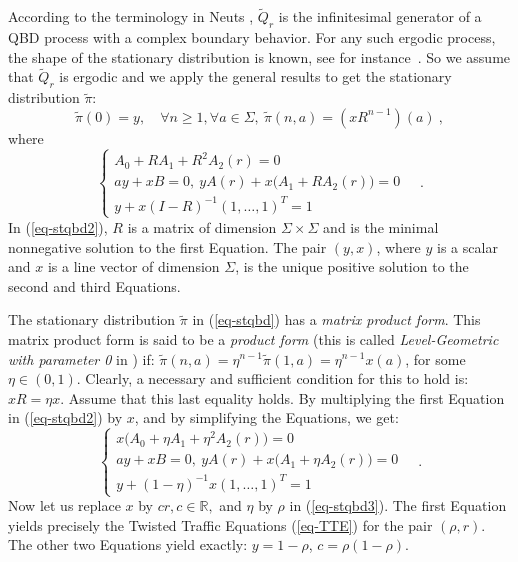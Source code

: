 \documentclass[11pt,a4paper]{article}
\theoremstyle{remark}
\def\Blackboardfont{\mathbb}
\def\R{{\Blackboardfont R}}
\def\eref#1{(\ref{#1})}
\begin{document}
\medskip

According to the terminology in Neuts \cite{neut}, $\widetilde{Q}_r$
is the infinitesimal generator of a QBD
process with a complex boundary behavior. For any such ergodic
process, the shape of the stationary
distribution is known, see for instance~\cite[Chapter
  1.5]{neut}. So we assume that $\widetilde{Q}_r$ is ergodic and we
apply the general results to get the stationary
distribution $\widetilde{\pi}$:
\begin{equation}\label{eq-stqbd}
\widetilde{\pi}(0) = y, \quad \forall n\geq 1,\forall a\in \Sigma, \ \widetilde{\pi}(n,a) =
(xR^{n-1})(a) \:,
\end{equation}
where
\begin{equation}\label{eq-stqbd2}
\begin{cases}
A_0 + RA_1 + R^2 A_2(r) = 0 & \\
ay + xB =0, \ yA(r) + x\bigl( A_1 + RA_2(r) \bigr) = 0 & \\
y + x (I -R)^{-1} (1,\dots ,1)^T =1 &
\end{cases}\:.
\end{equation}
In \eref{eq-stqbd2}, $R$ is a matrix of dimension $\Sigma\times \Sigma$ and
is the minimal nonnegative solution to the first Equation. The pair
$(y,x)$, where $y$ is a scalar and $x$ is a line
vector of dimension $\Sigma$, is the unique positive solution to
the second and third Equations.

\medskip

The stationary distribution $\widetilde{\pi}$ in \eref{eq-stqbd} has a
{\em matrix product form}. 
This matrix product form is said to be a {\em product form} (this
is called {\em Level-Geometric with parameter 0} in \cite{DaQu}) if:
$\widetilde{\pi}(n,a)=\eta^{n-1}\widetilde{\pi}(1,a)= \eta^{n-1}x(a)$, for some $\eta\in
(0,1)$. Clearly, a necessary and sufficient condition for this to hold
is: $xR=\eta x$.  Assume that this last equality holds.
By multiplying the first Equation in \eref{eq-stqbd2} by $x$, and by
simplifying the Equations, we get:
\begin{equation}\label{eq-stqbd3}
\begin{cases}
x\bigl( A_0 + \eta A_1 + \eta^2 A_2(r)\bigr) = 0 & \\
ay + xB =0, \ yA(r) + x\bigl( A_1 + \eta A_2(r) \bigr) = 0 & \\
y + (1-\eta)^{-1} x (1,\dots ,1)^T =1 &
\end{cases}\:.
\end{equation}
Now let us replace $x$ by $cr, c\in \R,$ and $\eta$ by $\rho$ in
\eref{eq-stqbd3}. The first Equation yields precisely the Twisted
Traffic Equations \eref{eq-TTE} for the pair $(\rho,r)$. The other two Equations
yield exactly: $y=1-\rho$, $c=\rho(1-\rho)$.
\end{document}
